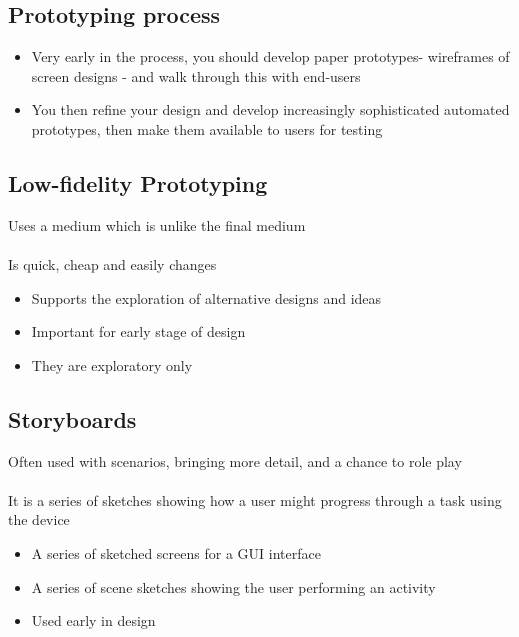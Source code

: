 \documentclass{article}[18pt]
\begin{document}
\subsection{Prototyping process}
\begin{itemize}
	\item Very early in the process, you should develop paper prototypes- wireframes of screen designs - and walk through this with end-users
	\item You then refine your design and develop increasingly sophisticated automated prototypes, then make them available to users for testing
\end{itemize}
\subsection{Low-fidelity Prototyping}
Uses a medium which is unlike the final medium\\
\\
Is quick, cheap and easily changes
\begin{itemize}
	\item Supports the exploration of alternative designs and ideas
	\item Important for early stage of design
	\item They are exploratory only
\end{itemize}
\subsection{Storyboards}
Often used with scenarios, bringing more detail, and a chance to role play\\
\\
It is a series of sketches showing how a user might progress through a task using the device
\begin{itemize}
	\item A series of sketched screens for a GUI interface
	\item A series of scene sketches showing the user performing an activity
	\item Used early in design
\end{itemize}
\end{document}
